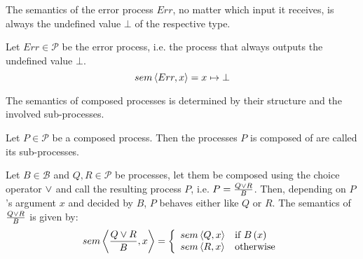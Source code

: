 The semantics of the error process $Err$, no matter which input it receives, is always the undefined value $\bot$ of the respective type. 
\begin{definition}
\label{def:sem_err}
Let $Err \in \mathcal{P}$ be the error process, i.e. the process that always outputs the undefined value $\bot$.
  \begin{equation}
    \label{eqn:sem_error}
    \sem{Err}{x} = x \mapsto \bot
  \end{equation}
  \hfill\qedsymbol
\end{definition}

The semantics of composed processes is determined by their structure and the involved sub-processes.

\begin{definition}
Let $P \in \mathcal{P}$ be a composed process. Then the processes $P$ is composed of are called its sub-processes.

\hfill\qedsymbol
\end{definition}

\begin{definition}
\label{def:sem_choice}
Let $B \in \mathcal{B}$ and $Q, R \in \mathcal{P}$ be processes, let them be composed using the choice operator $\choiceop$ and call the resulting process $P$, i.e. $P = \choice{B}{Q}{R}$. Then, depending on $P$'s argument $x$ and decided by $B$, $P$ behaves either like $Q$ or $R$. The semantics of $\choice{B}{Q}{R}$ is given by:
  \begin{equation}
    \label{eqn:sem_choice}
    \sem{\choice{B}{Q}{R}}{x} = \left\{ \begin{array}{ll}
      \sem{Q}{x} & \text{if } B\left(x\right) \\
      \sem{R}{x} & \text{otherwise}
    \end{array}\right.
  \end{equation}
  
  \hfill\qedsymbol
\end{definition}

